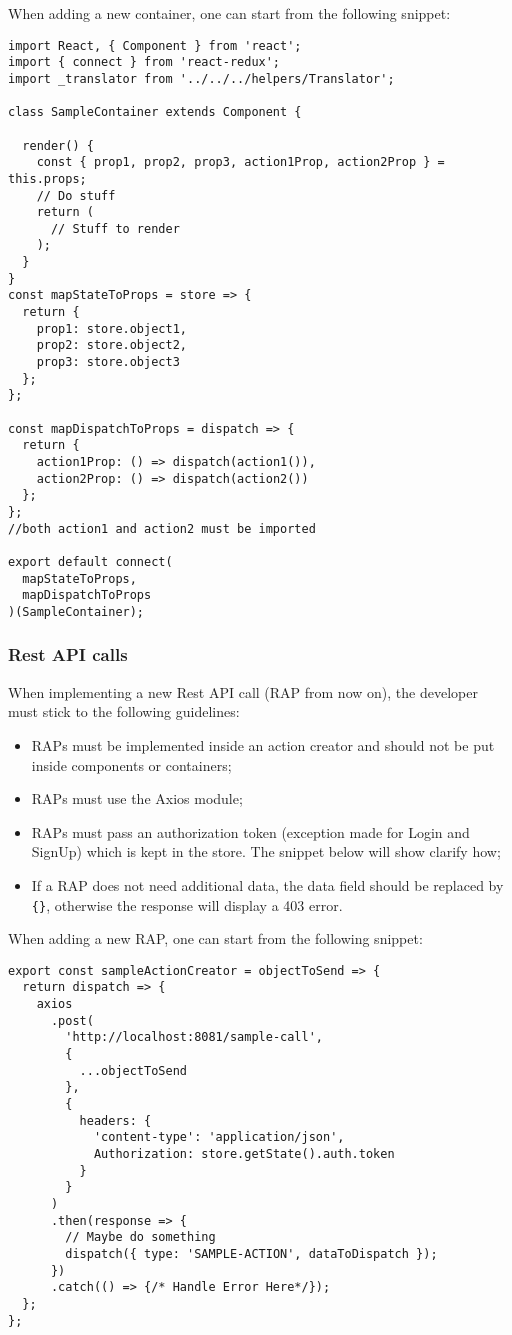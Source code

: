 When adding a new container, one can start from the following snippet:
\begin{lstlisting}
import React, { Component } from 'react';
import { connect } from 'react-redux';
import _translator from '../../../helpers/Translator';

class SampleContainer extends Component {

  render() {
    const { prop1, prop2, prop3, action1Prop, action2Prop } = this.props;
    // Do stuff
    return (
      // Stuff to render
    );
  }
}
const mapStateToProps = store => {
  return {
    prop1: store.object1,
    prop2: store.object2,
    prop3: store.object3
  };
};

const mapDispatchToProps = dispatch => {
  return {
    action1Prop: () => dispatch(action1()),
    action2Prop: () => dispatch(action2())
  };
};
//both action1 and action2 must be imported

export default connect(
  mapStateToProps,
  mapDispatchToProps
)(SampleContainer);
\end{lstlisting}


\subsubsection{Rest API calls}
When implementing a new Rest API call (RAP from now on), the developer must stick to the following guidelines:
\begin{itemize}
	\item RAPs must be implemented inside an action creator and should not be put inside components or containers;
	\item RAPs must use the Axios module;
	\item RAPs must pass an authorization token (exception made for Login and SignUp) which is kept in the store. The snippet below will show clarify how;
	\item If a RAP does not need additional data, the data field should be replaced by \texttt{\{\}}, otherwise the response will display a 403 error.
\end{itemize}
When adding a new RAP, one can start from the following snippet:
\begin{lstlisting}
export const sampleActionCreator = objectToSend => {
  return dispatch => {
    axios
      .post(
        'http://localhost:8081/sample-call',
        {
          ...objectToSend
        },
        {
          headers: {
            'content-type': 'application/json',
            Authorization: store.getState().auth.token
          }
        }
      )
      .then(response => {
        // Maybe do something
        dispatch({ type: 'SAMPLE-ACTION', dataToDispatch });
      })
      .catch(() => {/* Handle Error Here*/});
  };
};
\end{lstlisting}


